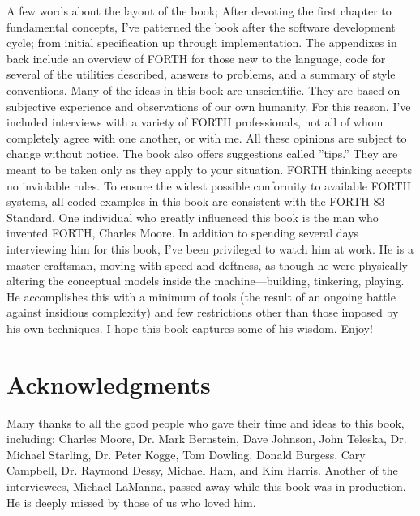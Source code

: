 A few words about the layout of the book; After devoting the first
chapter to fundamental concepts, I've patterned the book after the
software development cycle; from initial specification up through
implementation. The appendixes in back include an overview of FORTH
for those new to the language, code for several of the utilities described,
answers to problems, and a summary of style conventions. Many of the
ideas in this book are unscientific. They are based on subjective
experience and observations of our own humanity. For this reason,
I've included interviews with a variety of FORTH professionals, not
all of whom completely agree with one another, or with me. All these
opinions are subject to change without notice. The book also offers
suggestions called ''tips.'' They are meant to be taken only as they
apply to your situation. FORTH thinking accepts no inviolable rules.
To ensure the widest possible conformity to available FORTH systems,
all coded examples in this book are consistent with the FORTH-83 Standard.
One individual who greatly influenced this book is the man who invented
FORTH, Charles Moore. In addition to spending several days interviewing
him for this book, I've been privileged to watch him at work. He is
a master craftsman, moving with speed and deftness, as though he were
physically altering the conceptual models inside the machine---building,
tinkering, playing. He accomplishes this with a minimum of tools (the
result of an ongoing battle against insidious complexity) and few
restrictions other than those imposed by his own techniques. I hope
this book captures some of his wisdom. Enjoy!


\section{Acknowledgments}

Many thanks to all the good people who gave their time and ideas to
this book, including: Charles Moore, Dr. Mark Bernstein, Dave Johnson,
John Teleska, Dr. Michael Starling, Dr. Peter Kogge, Tom Dowling,
Donald Burgess, Cary Campbell, Dr. Raymond Dessy, Michael Ham, and
Kim Harris. Another of the interviewees, Michael LaManna, passed away
while this book was in production. He is deeply missed by those of
us who loved him. 


